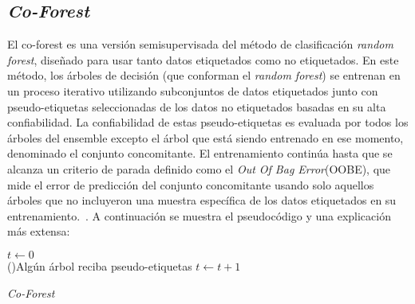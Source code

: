 \subsection{\textit{Co-Forest}}
El co-forest es una versión semisupervisada del método de clasificación \textit{random forest}, diseñado para usar tanto datos etiquetados como no etiquetados. En este método, los árboles de decisión (que conforman el \textit{random forest}) se entrenan en un proceso iterativo utilizando subconjuntos de datos etiquetados junto con pseudo-etiquetas seleccionadas de los datos no etiquetados basadas en su alta confiabilidad. La confiabilidad de estas pseudo-etiquetas es evaluada por todos los árboles del ensemble excepto el árbol que está siendo entrenado en ese momento, denominado el conjunto concomitante. El entrenamiento continúa hasta que se alcanza un criterio de parada definido como el \textit{Out Of Bag Error}(OOBE), que mide el error de predicción del conjunto concomitante usando solo aquellos árboles que no incluyeron una muestra específica de los datos etiquetados en su entrenamiento.~\cite{IEEE:CoForest}. A continuación se muestra el pseudocódigo y una explicación más extensa:
\begin{algorithm}
	\label{alg:Co-Forest}
	\BlankLine
	
	$t \leftarrow 0$\\
	\While(){Algún árbol reciba pseudo-etiquetas}{
		$t \leftarrow t + 1$\\
		
	}
	\caption{\textit{Co-Forest}}
\end{algorithm}

